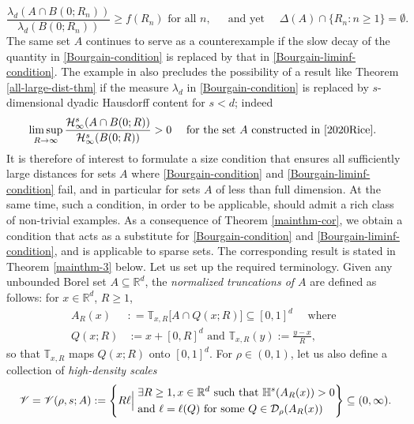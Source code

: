 \documentclass[a4paper,11pt]{amsart}
\numberwithin{equation}{section}
\begin{document}
\[ \frac{\lambda_d(A \cap B(0;R_n))}{ \lambda_d(B(0;R_n))} \geq f(R_n)\text{ for all $n$, }    \quad \text{ and yet } \quad \Delta(A) \cap \{R_n: n \geq 1\} = \emptyset. \]   
The same set $A$ continues to serve as a counterexample if the slow decay of the quantity in \eqref{Bourgain-condition} is replaced by that in \eqref{Bourgain-liminf-condition}. 
\vskip0.1in
\noindent The example in \cite{2020Rice} also precludes the possibility of a result like Theorem \ref{all-large-dist-thm} if the measure $\lambda_d$ in \eqref{Bourgain-condition} is replaced by $s$-dimensional dyadic Hausdorff content for $s < d$; indeed
\[ \limsup_{R \rightarrow \infty} \frac{\mathcal H_{\infty}^s(A \cap B(0;R))}{\mathcal H_{\infty}^{s}(B(0;R))} > 0 \quad \text{ for the set $A$ constructed in \cite{2020Rice}. } \] 
It is therefore of interest to formulate a size condition that ensures all sufficiently large distances for sets $A$ where \eqref{Bourgain-condition} and \eqref{Bourgain-liminf-condition} fail, and in particular for sets $A$ of less than full dimension. At the same time, such a condition, in order to be applicable, should admit a rich class of non-trivial examples. As a consequence of Theorem \ref{mainthm-cor}, we obtain a condition that acts as a substitute for \eqref{Bourgain-condition} and \eqref{Bourgain-liminf-condition}, and is applicable to sparse sets. The corresponding result is stated in Theorem  \ref{mainthm-3} below.  
\vskip0.1in
\noindent  Let us set up the required terminology. Given any unbounded Borel set $A \subseteq \mathbb R^d$, the {\em{normalized truncations of $A$}} are defined as follows: for $x \in \mathbb R^d$, $R \geq 1$, 
\begin{align} A_R(x) &: = \mathbb T_{x,R} \bigl[A \cap Q(x;R) \bigr] \subseteq [0,1]^d \quad \text{ where } \label{def-ARx} \\
Q(x;R) &:= x + [0, R]^d \text{ and } \mathbb T_{x,R}(y) := \frac{y-x}{R},  \nonumber 
\end{align} 
so that $\mathbb T_{x,R}$ maps $Q(x;R)$ onto $[0,1]^d$. For $\rho \in (0,1)$, let us also define a collection of {\em{high-density scales}}
\begin{equation} 
\mathscr{V} = \mathscr{V}(\rho, s; A) := \left\{R \ell \Bigl| \; \begin{aligned} &\exists R \geq 1, x \in \mathbb R^d \text{ such that } \mathbb H^s(A_R(x)) > 0 \\  &\text{and } \ell = \ell(Q) \text{ for some } Q \in \mathcal D_{\rho}(A_R(x)) \end{aligned} \right\} \subseteq (0, \infty). \label{def-V} 
\end{equation} 
\end{document}
